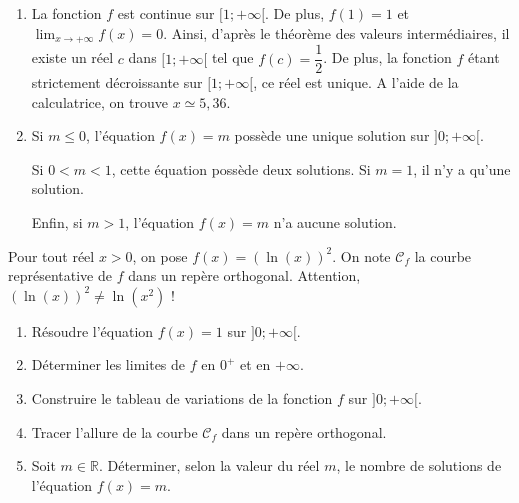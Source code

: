 \documentclass[11pt,fleqn, openany]{book} %
\begin{document}
\begin{solution}
\begin{enumerate}
\item  La fonction $f$ est continue sur $[1;+\infty[$. De plus, $f(1)=1$ et $\displaystyle \lim_{x\to+\infty}f(x)=0$. Ainsi, d'après le théorème des valeurs intermédiaires, il existe un réel $c$ dans $[1;+\infty[$ tel que $f(c)=\dfrac{1}{2}$. De plus, la fonction $f$ étant strictement décroissante sur $[1;+\infty[$, ce réel est unique. A l'aide de la calculatrice, on trouve $x \simeq 5,36$.

\item  Si $m \leqslant 0$, l'équation $f(x)=m$ possède une unique solution sur $]0;+\infty[$.

Si $0 < m < 1$, cette équation possède deux solutions. Si $m=1$, il n'y a qu'une solution. 

Enfin, si $m>1$, l'équation $f(x)=m$ n'a aucune solution.

\end{enumerate}
\end{solution}




\begin{exercise} Pour tout réel $x>0$, on pose $f(x)=(\ln(x))^2$.
On note $\mathcal{C}_f$ la courbe représentative de $f$ dans un repère orthogonal. Attention, $(\ln(x))^2 \neq \ln(x^2)$ !
\begin{enumerate}
\item Résoudre l'équation $f(x)=1$ sur $]0;+\infty[$.
\item Déterminer les limites de $f$ en $0^+$ et en $+\infty$.
\item Construire le tableau de variations de la fonction $f$ sur $]0;+\infty[$. 
\item Tracer l'allure de la courbe $\mathcal{C}_f$ dans un repère orthogonal.
\item Soit $m \in \mathbb{R}$. Déterminer, selon la valeur du réel $m$, le nombre de solutions de l'équation $f(x)=m$.
\end{enumerate}
\end{exercise}
\end{document}
